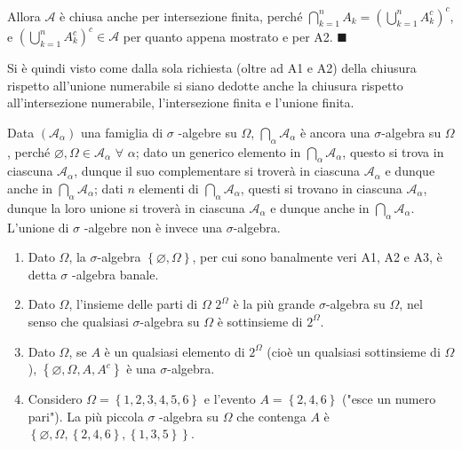 \documentclass{article}
\begin{document}
Allora $\mathcal{A}$ \`{e} chiusa anche per intersezione finita, perch\'{e} $%
\bigcap_{k=1}^{n}A_{k}=\left( \bigcup_{k=1}^{n}A_{k}^{c}\right) ^{c}$, e $%
\left( \bigcup_{k=1}^{n}A_{k}^{c}\right) ^{c}\in \mathcal{A}$ per quanto
appena mostrato e per A2. $\blacksquare $

Si \`{e} quindi visto come dalla sola richiesta (oltre ad A1 e A2) della
chiusura rispetto all'unione numerabile si siano dedotte anche la chiusura
rispetto all'intersezione numerabile, l'intersezione finita e l'unione
finita.

Data $\left( \mathcal{A}_{\alpha }\right) $ una famiglia di $\sigma $%
-algebre su $\Omega $, $\bigcap_{\alpha }\mathcal{A}_{\alpha }$ \`{e} ancora
una $\sigma $-algebra su $\Omega $, perch\'{e} $\varnothing ,\Omega \in 
\mathcal{A}_{\alpha }$ $\forall $ $\alpha $; dato un generico elemento in $%
\bigcap_{\alpha }\mathcal{A}_{\alpha }$, questo si trova in ciascuna $%
\mathcal{A}_{\alpha }$, dunque il suo complementare si trover\`{a} in
ciascuna $\mathcal{A}_{\alpha }$ e dunque anche in $\bigcap_{\alpha }%
\mathcal{A}_{\alpha }$; dati $n$ elementi di $\bigcap_{\alpha }\mathcal{A}%
_{\alpha }$, questi si trovano in ciascuna $\mathcal{A}_{\alpha }$, dunque
la loro unione si trover\`{a} in ciascuna $\mathcal{A}_{\alpha }$ e dunque
anche in $\bigcap_{\alpha }\mathcal{A}_{\alpha }$. L'unione di $\sigma $%
-algebre non \`{e} invece una $\sigma $-algebra.

\begin{enumerate}
\item Dato $\Omega $, la $\sigma $-algebra $\left\{ \varnothing ,\Omega
\right\} $, per cui sono banalmente veri A1, A2 e A3, \`{e} detta $\sigma $%
-algebra banale.

\item Dato $\Omega $, l'insieme delle parti di $\Omega $ $2^{\Omega }$ \`{e}
la pi\`{u} grande $\sigma $-algebra su $\Omega $, nel senso che qualsiasi $%
\sigma $-algebra su $\Omega $ \`{e} sottinsieme di $2^{\Omega }$.

\item Dato $\Omega $, se $A$ \`{e} un qualsiasi elemento di $2^{\Omega }$
(cio\`{e} un qualsiasi sottinsieme di $\Omega $), $\left\{ \varnothing
,\Omega ,A,A^{c}\right\} $ \`{e} una $\sigma $-algebra.

\item Considero $\Omega =\left\{ 1,2,3,4,5,6\right\} $ e l'evento $A=\left\{
2,4,6\right\} $ ("esce un numero pari"). La pi\`{u} piccola $\sigma $%
-algebra su $\Omega $ che contenga $A$ \`{e} $\left\{ \varnothing ,\Omega
,\left\{ 2,4,6\right\} ,\left\{ 1,3,5\right\} \right\} $.
\end{enumerate}
\end{document}
